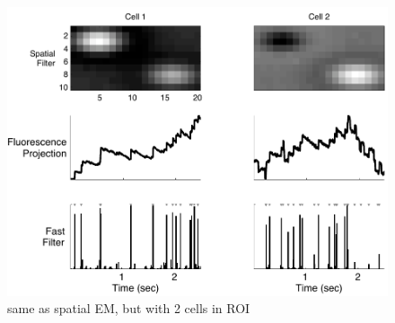 \newpage \begin{figure}[H]
\centering \includegraphics[width=.9\linewidth]{../figs/spatial_multi}
\caption{same as spatial EM, but with 2 cells in ROI} \label{fig:spatial_multi}
\end{figure}

